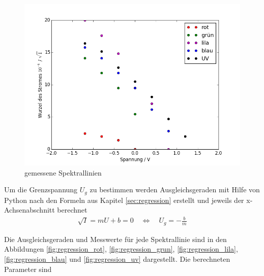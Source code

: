 \begin{figure}[h!]
	\centering
	\includegraphics[width=\textwidth]{build/AlleWellenlangen.png}
	\caption{gemessene Spektrallinien}
	\label{fig:spektrallinien}
\end{figure}

\clearpage
Um die Grenzspannung $U_g$ zu bestimmen werden Ausgleichsgeraden mit Hilfe von Python nach den Formeln aus Kapitel \ref{sec:regression} erstellt und jeweils der x-Achsenabschnitt berechnet
\begin{align}
	\sqrt{I} = mU +b = 0\quad  \Leftrightarrow 	\quad U_g = - \frac{b}{m}
\end{align}	

Die Ausgleichsgeraden und Messwerte für jede Spektrallinie sind in den Abbildungen \ref{fig:regression_rot}, \ref{fig:regression_grun}, \ref{fig:regression_lila}, \ref{fig:regression_blau} und \ref{fig:regression_uv} dargestellt. Die berechneten Parameter sind

